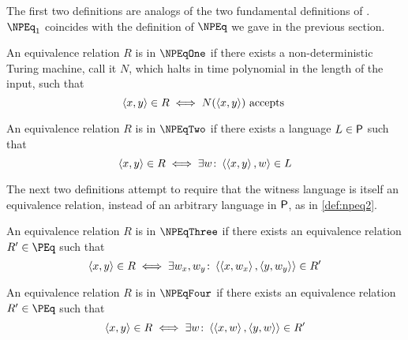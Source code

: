 The first two definitions are analogs of the two fundamental definitions of \NP.
$\NPEq_1$ coincides with the definition of $\NPEq$ we gave in the previous section.
\begin{definition}\label{def:npeq1}
  An equivalence relation $R$ is in $\NPEqOne$ if there exists a non-deterministic Turing machine, call it $N$, which halts in time polynomial in the length of the input, such that
  \begin{displaymath}
    \pair{x}{y}\in R\iff N(\pair{x}{y})\plain{accepts}
  \end{displaymath}
\end{definition}
\begin{definition}\label{def:npeq2}
  An equivalence relation $R$ is in $\NPEqTwo$ if there exists a language $L\in\P$ such that
  \begin{displaymath}
    \pair{x}{y}\in R\iff \exists w\colon \pair{\pair{x}{y}}{w}\in L
  \end{displaymath}
\end{definition}

The next two definitions attempt to require that the witness language is itself an equivalence relation, instead of an arbitrary language in $\P$, as in \autoref{def:npeq2}.
\begin{definition}\label{def:npeq3}
  An equivalence relation $R$ is in $\NPEqThree$ if there exists an equivalence relation $R'\in \PEq$ such that
  \begin{displaymath}
    \pair{x}{y}\in R\iff \exists w_x,w_y\colon \pair{\pair{x}{w_x}}{\pair{y}{w_y}}\in R'
  \end{displaymath}
\end{definition}
\begin{definition}\label{def:npeq4}
  An equivalence relation $R$ is in $\NPEqFour$ if there exists an equivalence relation $R'\in \PEq$ such that
  \begin{displaymath}
    \pair{x}{y}\in R\iff \exists w\colon \pair{\pair{x}{w}}{\pair{y}{w}}\in R'
  \end{displaymath}
\end{definition}

